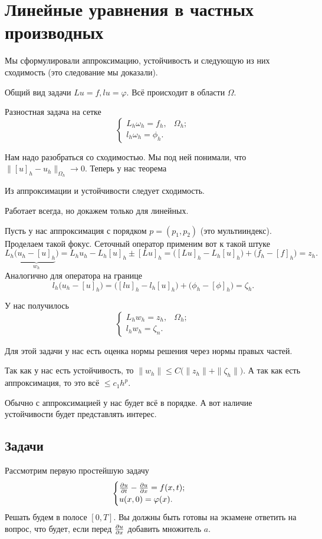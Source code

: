 \section{Линейные уравнения в частных производных}
Мы сформулировали аппроксимацию, устойчивость и следующую из них сходимость (это следование мы доказали).

Общий вид задачи $Lu = f, lu = \varphi$. Всё происходит в области $\Omega$.

Разностная задача на сетке
\[
\begin{cases}
L_h\omega_h = f_h, & \Omega_h;\\
l_h\omega_h = \phi_h.
\end{cases}
\]

Нам надо разобраться со сходимостью. Мы под ней понимали, что $\big\|[u]_h - u_h\big\|_{\Omega_h}\to 0$. Теперь у нас теорема
\begin{The}
 Из аппроксимации и устойчивости следует сходимость.
\end{The}
Работает всегда, но докажем только для линейных.
\begin{Proof} Пусть у нас аппроксимация с порядком $p = (p_1,p_2)$ (это мультииндекс).
  Проделаем такой фокус. Сеточный оператор применим вот к такой штуке
\[
  L_h\big(\underbrace{u_h-[u]_h}_{w_h}\big) = L_hu_h - L_h[u]_h\pm [Lu]_h = 
  \big([Lu]_h - L_h[u]_h\big) + \big(f_h - [f]_h\big) = z_h.
\]
Аналогично для оператора на границе
\[
  l_h\big(u_h - [u]_h\big) = \big([lu]_h - l_h[u]_h\big) + \big(\phi_h - [\phi]_h\big) = \zeta_h.
\]

У нас получилось
\[
\begin{cases}
L_hw_h = z_h,&\Omega_h;\\
l_hw_h = \zeta_n.
\end{cases}
\]

Для этой задачи у нас есть оценка нормы решения через нормы правых частей.

Так как у нас есть устойчивость, то $\|w_h\|\le C\big(\|z_h\| + \|\zeta_h\|\big)$. А так как есть аппроксимация, то это всё $\le c_1 h^p$.
\end{Proof}

Обычно с аппроксимацией у нас будет всё в порядке. А вот наличие устойчивости будет представлять интерес.

\subsection{Задачи}
Рассмотрим первую простейшую задачу
\[\begin{cases}
  \frac{\partial u}{\partial t} - \frac{\partial u}{\partial x} = f(x,t);\\
  u(x,0) = \varphi(x).
\end{cases}
\]
Решать будем в полосе $[0,T]$. Вы должны быть готовы на экзамене ответить на вопрос, что будет, если перед $\frac{\partial u}{\partial x}$ добавить множитель $a$.

